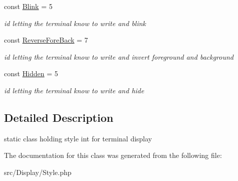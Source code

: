 \begin{DoxyCompactItemize}
\mbox{\label{classDisplay_1_1Style_a0c232b5dbf81b4ffcba9e134b8751166}} 
const \hyperlink{classDisplay_1_1Style_a0c232b5dbf81b4ffcba9e134b8751166}{Blink} = 5
\begin{DoxyCompactList}\small\item\em id letting the terminal know to write and blink \end{DoxyCompactList}\item 
\mbox{\label{classDisplay_1_1Style_ab675eae45b0ec96048c51f4cf015b615}} 
const \hyperlink{classDisplay_1_1Style_ab675eae45b0ec96048c51f4cf015b615}{Reverse\+Fore\+Back} = 7
\begin{DoxyCompactList}\small\item\em id letting the terminal know to write and invert foreground and background \end{DoxyCompactList}\item 
\mbox{\label{classDisplay_1_1Style_acbb70d4c7fe1bef0445f4775c32195d7}} 
const \hyperlink{classDisplay_1_1Style_acbb70d4c7fe1bef0445f4775c32195d7}{Hidden} = 5
\begin{DoxyCompactList}\small\item\em id letting the terminal know to write and hide \end{DoxyCompactList}\end{DoxyCompactItemize}


\subsection{Detailed Description}
static class holding style int for terminal display 

The documentation for this class was generated from the following file\+:\begin{DoxyCompactItemize}
\item 
src/\+Display/Style.\+php\end{DoxyCompactItemize}
